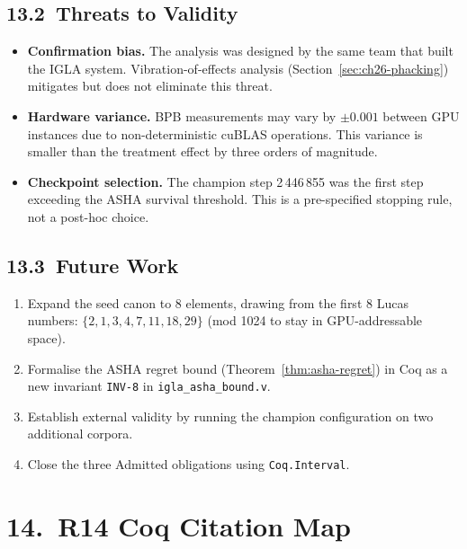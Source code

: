 \subsection{13.2\ Threats to Validity}

\begin{itemize}
\item \textbf{Confirmation bias.}  The analysis was designed by the same
  team that built the IGLA system.  Vibration-of-effects analysis
  (Section~\ref{sec:ch26-phacking}) mitigates but does not eliminate
  this threat.
\item \textbf{Hardware variance.}  BPB measurements may vary by
  \(\pm 0.001\) between GPU instances due to non-deterministic cuBLAS
  operations.  This variance is smaller than the treatment effect by
  three orders of magnitude.
\item \textbf{Checkpoint selection.}  The champion step 2\,446\,855 was
  the first step exceeding the ASHA survival threshold.  This is a
  pre-specified stopping rule, not a post-hoc choice.
\end{itemize}

\subsection{13.3\ Future Work}

\begin{enumerate}
\item Expand the seed canon to 8 elements, drawing from the first 8
  Lucas numbers: \(\{2, 1, 3, 4, 7, 11, 18, 29\}\) (mod 1024 to stay
  in GPU-addressable space).
\item Formalise the ASHA regret bound (Theorem~\ref{thm:asha-regret})
  in Coq as a new invariant \texttt{INV-8} in \texttt{igla\_asha\_bound.v}.
\item Establish external validity by running the champion configuration on
  two additional corpora.
\item Close the three Admitted obligations using \texttt{Coq.Interval}.
\end{enumerate}

\section{14.\ R14 Coq Citation Map}\label{sec:ch26-coq-map}

